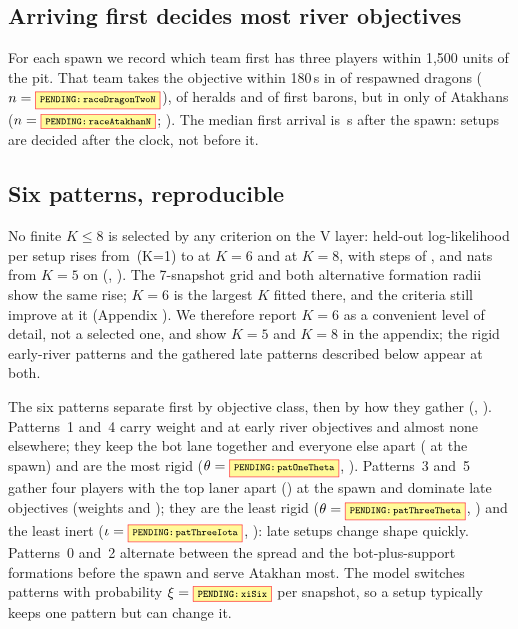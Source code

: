 \subsection{Arriving first decides most river objectives}
\label{sec:race}


For each spawn we record which team first has three players within 1,500 units of the pit.
That team takes the objective within 180\,s in  of respawned dragons ($n=\V{raceDragonTwoN}$),  of heralds and  of first barons, but in only  of Atakhans ($n=\V{raceAtakhanN}$; ).
The median first arrival is \,s after the spawn: setups are decided after the clock, not before it.

\subsection{Six patterns, reproducible}
\label{sec:patterns}



No finite $K\leq8$ is selected by any criterion on the V layer: held-out log-likelihood per setup rises from \,(K=1) to  at $K=6$ and  at $K=8$, with steps of ,  and  nats from $K=5$ on (, ).
The 7-snapshot grid and both alternative formation radii show the same rise; $K=6$ is the largest $K$ fitted there, and the criteria still improve at it (Appendix ).
We therefore report $K=6$ as a convenient level of detail, not a selected one, and show $K=5$ and $K=8$ in the appendix; the rigid early-river patterns and the gathered late patterns described below appear at both.


The six patterns separate first by objective class, then by how they gather (, ).
Patterns~1 and~4 carry weight  and  at early river objectives and almost none elsewhere; they keep the bot lane together and everyone else apart (\texttt{} at the spawn) and are the most rigid ($\theta=\V{patOneTheta}$, ).
Patterns~3 and~5 gather four players with the top laner apart (\texttt{}) at the spawn and dominate late objectives (weights  and ); they are the least rigid ($\theta=\V{patThreeTheta}$, ) and the least inert ($\iota=\V{patThreeIota}$, ): late setups change shape quickly.
Patterns~0 and~2 alternate between the spread and the bot-plus-support formations before the spawn and serve Atakhan most.
The model switches patterns with probability $\xi=\V{xiSix}$ per snapshot, so a setup typically keeps one pattern but can change it.

